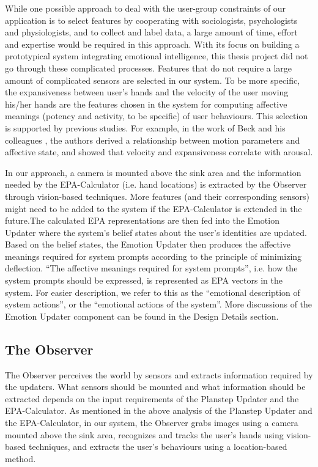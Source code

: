 While one possible approach to deal with the user-group constraints of our application is to select features by cooperating with sociologists, psychologists and physiologists, and to collect and label data, a large amount of time, effort and expertise would be required in this approach. With its focus on building a prototypical system integrating emotional intelligence, this thesis project did not go through these complicated processes. Features that do not require a large amount of complicated sensors are selected in our system. To be more specific, the expansiveness between user's hands and the velocity of the user moving his/her hands are the features chosen in the system for computing affective meanings (potency and activity, to be specific) of user behaviours. This selection is supported by previous studies. For example, in the work of Beck and his colleagues \cite{beck2010interpretation}, the authors derived a relationship between motion parameters and affective state, and showed that velocity and expansiveness correlate with arousal.

In our approach, a camera is mounted above the sink area and the information needed by the EPA-Calculator (i.e. hand locations) is extracted by the Observer through vision-based techniques. More features (and their corresponding sensors) might need to be added to the system if the EPA-Calculator is extended in the future.The calculated EPA representations are then fed into the Emotion Updater where the system's belief states about the user's identities are updated. Based on the belief states, the Emotion Updater then produces the affective meanings required for system prompts according to the principle of minimizing deflection. ``The affective meanings required for system prompts'', i.e. how the system prompts should be expressed, is represented as EPA vectors in the system. For easier description, we refer to this as the ``emotional description of system actions'', or the ``emotional actions of the system''. More discussions of the Emotion Updater component can be found in the Design Details section.

\subsection{The Observer}

The Observer perceives the world by sensors and extracts information required by the updaters. What sensors should be mounted and what information should be extracted depends on the input requirements of the Planstep Updater and the EPA-Calculator. As mentioned in the above analysis of the Planstep Updater and the EPA-Calculator, in our system, the Observer grabs images using a camera mounted above the sink area, recognizes and tracks the user's hands using vision-based techniques, and extracts the user's behaviours using a location-based method.

